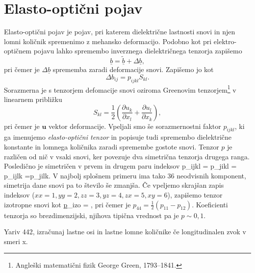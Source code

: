 \section{Elasto-optični pojav}
Elasto-optični pojav je pojav, pri katerem dielektrične lastnosti snovi in njen lomni količnik
spremenimo z mehansko deformacijo. Podobno kot pri elektro-optičnem pojavu lahko 
spremembo inverznega dielektričnega tenzorja zapišemo 
\begin{equation}
\underline{b} = \underline{\tilde{b}}+ \Delta\underline{b},
\end{equation}
pri čemer je $\Delta\underline{b}$ sprememba zaradi deformacije snovi. Zapišemo jo kot
\begin{equation}
 \Delta b_{ij}=p_{ijkl}S_{kl}.
\label{7.27}
\end{equation}
Sorazmerna je s tenzorjem defomacije snovi oziroma 
Greenovim tenzorjem\footnote{Angleški matematični fizik George Green, 1793--1841.} v
linearnem približku
\begin{equation}
S_{kl}=\frac{1}{2}\left({\frac{\partial u_{k}}{\partial x_{l}}}+{\frac{\partial u_{l}}{\partial x_{k}}}\right),
\label{7.28}
\end{equation}
pri čemer je $\mathbf{u}$ vektor deformacije. Vpeljali smo še sorazmernostni faktor
$p_{ijkl}$, ki ga imenujemo \textit{elasto-optični tenzor} in popisuje tudi spremembo 
dielektrične konstante in lomnega količnika zaradi spremembe gostote snovi. 
Tenzor $p$ je različen od nič v vsaki snovi, ker povezuje dva simetrična tenzorja 
drugega ranga. Posledično je simetričen v prvem in drugem paru indeksov
\beq
p_{ijkl} = p_{jikl} = p_{ijlk} =p_{jilk}.
\eeq
V najbolj splošnem primeru ima tako 36 neodvisnih komponent, simetrija dane
snovi pa to število še zmanjša. Če vpeljemo skrajšan zapis indeksov ($xx = 1,
yy=2, zz = 3, yz = 4, zx = 5, xy = 6$), zapišemo tenzor izotropne snovi kot
\beq
\underline{p}_{\textrm{izo}} = 
,
\label{tenzorp}
\eeq
pri čemer je $p_{44}= \frac{1}{2}(p_{11}-p_{12})$. Koeficienti tenzorja so 
brezdimenzijski, njihova tipična vrednost pa je $p\sim0,1$.
\begin{definition}
Yariv 442, izračunaj lastne osi in lastne lomne količnike če longitudinalen zvok v smeri x.
\end{definition}


